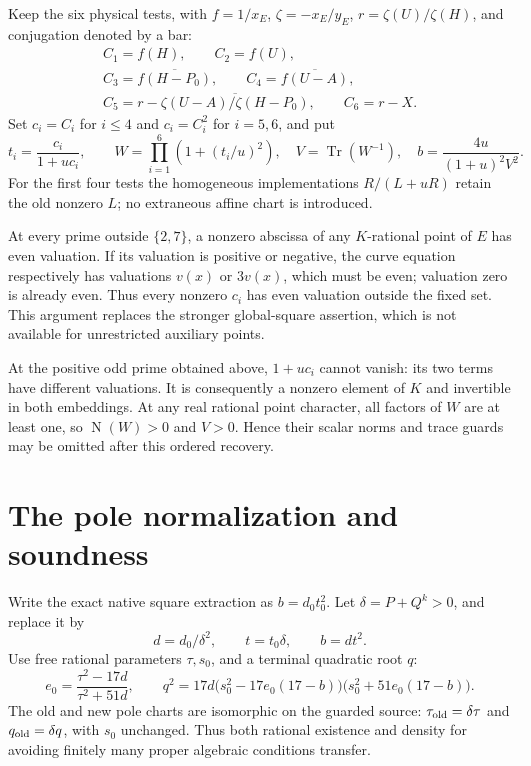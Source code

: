 \documentclass[11pt,a4paper]{article}
\newcommand{\Tr}{\operatorname{Tr}}\newcommand{\rad}{\operatorname{rad}}
\newcommand{\N}{\operatorname{N}}
\begin{document}
Keep the six physical tests, with $f=1/x_E$, $\zeta=-x_E/y_E$,
$r=\zeta(U)/\zeta(H)$, and conjugation denoted by a bar:
\[
 \begin{gathered}
 C_1=f(H),\qquad C_2=f(U),\\
 C_3=\overline{f(H-P_0)},\qquad C_4=\overline{f(U-A)},\\
 C_5=r-\overline{\zeta(U-A)/\zeta(H-P_0)},\qquad C_6=r-X.
 \end{gathered}
\]
Set $c_i=C_i$ for $i\le4$ and $c_i=C_i^2$ for $i=5,6$, and put
\[
 t_i=\frac{c_i}{1+u c_i},\qquad
 W=\prod_{i=1}^6\left(1+(t_i/u)^2\right),\quad V=\Tr(W^{-1}),
 \quad b=\frac{4u}{(1+u)^2V^2}.
\]
For the first four tests the homogeneous implementations $R/(L+uR)$
retain the old nonzero $L$; no extraneous affine chart is introduced.

At every prime outside $\{2,7\}$, a nonzero abscissa of any $K$-rational
point of $E$ has even valuation. If its valuation is positive or negative,
the curve equation respectively has valuations $v(x)$ or $3v(x)$,
which must be even; valuation zero is already even. Thus every nonzero
$c_i$ has even valuation outside the fixed set. This argument replaces the
stronger global-square assertion, which is not available for unrestricted
auxiliary points.

At the positive odd prime obtained above, $1+u c_i$ cannot vanish: its
two terms have different valuations. It is consequently a nonzero element
of $K$ and invertible in both embeddings. At any real rational point
character, all factors of $W$ are at least one, so $\N(W)>0$ and
$V>0$. Hence their scalar norms and trace guards may be omitted after
this ordered recovery.

\section{The pole normalization and soundness}
Write the exact native square extraction as $b=d_0 t_0^2$. Let
$\delta=P+Q^k>0$, and replace it by
\[
 d=d_0/\delta^2,\qquad t=t_0\delta,\qquad b=dt^2.
\]
Use free rational parameters $\tau,s_0$, and a terminal quadratic root $q$:
\[
 e_0=\frac{\tau^2-17d}{\tau^2+51d},\qquad
 q^2=17d\bigl(s_0^2-17e_0(17-b)\bigr)
           \bigl(s_0^2+51e_0(17-b)\bigr).
\]
The old and new pole charts are isomorphic on the guarded source:
$\tau_{\rm old}=\delta\tau$ and $q_{\rm old}=\delta q$, with $s_0$ unchanged.
Thus both rational existence and density for avoiding finitely many
proper algebraic conditions transfer.
\end{document}
